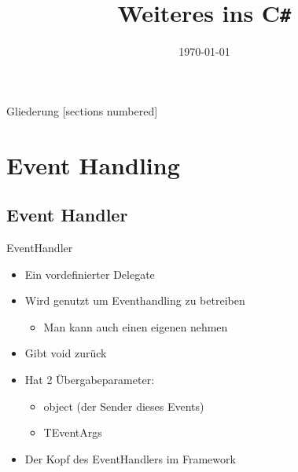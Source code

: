 



\title{Weiteres ins C\texttt{\#}}
\date{\today}




\maketitle

\begin{frame}{Gliederung}
	[sections numbered]
	\tableofcontents
\end{frame}

\section{Event Handling}
\subsection{Event Handler}
\begin{frame}{EventHandler}
	\begin{itemize}
		\item Ein vordefinierter Delegate
		\item Wird genutzt um Eventhandling zu betreiben
		\begin{itemize}
			\item Man kann auch einen eigenen nehmen
		\end{itemize}
		\item Gibt \alert{void} zurück
		\item Hat 2 Übergabeparameter:
		\begin{itemize}
			\item \alert{object} (der Sender dieses Events)
			\item \alert{TEventArgs}
		\end{itemize}
	\end{itemize}
	\begin{itemize}
		\item Der Kopf des EventHandlers im Framework
	\end{itemize}
		
\end{frame}

